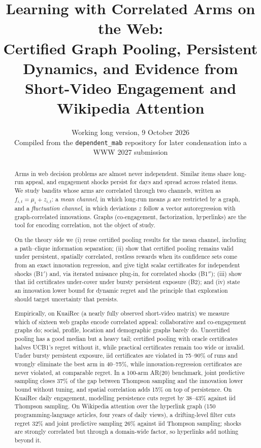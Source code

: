 \documentclass[11pt]{article}
\title{Learning with Correlated Arms on the Web:\\
Certified Graph Pooling, Persistent Dynamics, and Evidence from\\ Short-Video Engagement and Wikipedia Attention}
\author{Working long version, 9 October 2026\\
\small Compiled from the \texttt{dependent\_mab} repository for later condensation into a WWW 2027 submission}
\date{}
\theoremstyle{definition}
\theoremstyle{remark}
\begin{document}
\maketitle

\begin{abstract}
Arms in web decision problems are almost never independent. Similar items share long-run appeal, and engagement shocks persist for days and spread across related items. We study bandits whose arms are correlated through two channels, written as $f_{i,t}=\mu_i+z_{i,t}$: a \emph{mean channel}, in which long-run means $\mu$ are restricted by a graph, and a \emph{fluctuation channel}, in which deviations $z$ follow a vector autoregression with graph-correlated innovations. Graphs (co-engagement, factorization, hyperlinks) are the tool for encoding correlation, not the object of study.

On the theory side we (i) reuse certified pooling results for the mean channel, including a path--clique information separation; (ii) show that certified pooling remains valid under persistent, spatially correlated, restless rewards when its confidence sets come from an exact innovation regression, and give tight scalar certificates for independent shocks (B1$'$) and, via iterated nuisance plug-in, for correlated shocks (B1$''$); (iii) show that iid certificates under-cover under bursty persistent exposure (B2); and (iv) state an innovation lower bound for dynamic regret and the principle that exploration should target uncertainty that persists.

Empirically, on KuaiRec (a nearly fully observed short-video matrix) we measure which of sixteen web graphs encode correlated appeal: collaborative and co-engagement graphs do; social, profile, location and demographic graphs barely do. Uncertified pooling has a good median but a heavy tail; certified pooling with oracle certificates halves UCB1's regret without it, while practical certificates remain too wide or invalid. Under bursty persistent exposure, iid certificates are violated in 75--90\% of runs and wrongly eliminate the best arm in 40--75\%, while innovation-regression certificates are never violated, at comparable regret. In a 100-arm AR(20) benchmark, joint predictive sampling closes 37\% of the gap between Thompson sampling and the innovation lower bound without tuning, and spatial correlation adds 15\% on top of persistence. On KuaiRec daily engagement, modelling persistence cuts regret by 38--43\% against iid Thompson sampling. On Wikipedia attention over the hyperlink graph (150 programming-language articles, four years of daily views), a drifting-level filter cuts regret 32\% and joint predictive sampling 26\% against iid Thompson sampling; shocks are strongly correlated but through a domain-wide factor, so hyperlinks add nothing beyond it.
\end{abstract}
\end{document}
